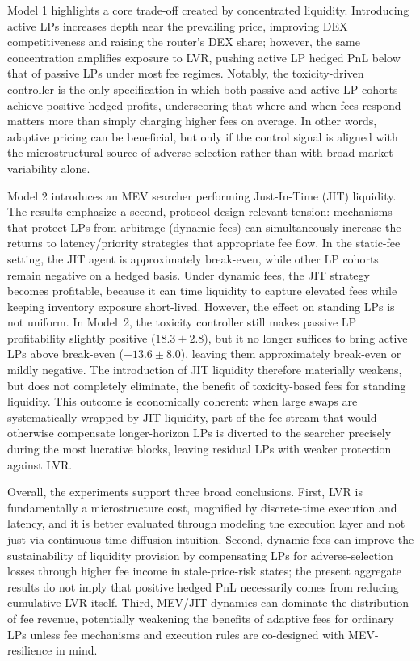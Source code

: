 \documentclass[11pt]{article}
\begin{document}
Model 1 highlights a core trade-off created by concentrated liquidity. Introducing active LPs increases depth near 
the prevailing price, improving DEX competitiveness and raising the router’s DEX share; however, the same concentration 
amplifies exposure to LVR, pushing active LP hedged PnL below that of passive LPs under most fee regimes. Notably, 
the toxicity-driven controller is the only specification in which both passive and active LP cohorts achieve positive 
hedged profits, underscoring that where and when fees respond matters more than simply charging higher fees on average. 
In other words, adaptive pricing can be beneficial, but only if the control signal is aligned with the microstructural 
source of adverse selection rather than with broad market variability alone.


Model 2 introduces an MEV searcher performing Just-In-Time (JIT) liquidity. The results emphasize a second,
protocol-design-relevant tension: mechanisms that protect LPs from arbitrage (dynamic fees) can simultaneously increase
the returns to latency/priority strategies that appropriate fee flow. In the static-fee setting, the JIT agent is
approximately break-even, while other LP cohorts remain negative on a hedged basis. Under dynamic fees, the JIT strategy
becomes profitable, because it can time liquidity to capture elevated fees while keeping inventory exposure short-lived.
However, the effect on standing LPs is not uniform. In Model~2, the toxicity controller still makes passive LP
profitability slightly positive (\(18.3\pm 2.8\)), but it no longer suffices to bring active LPs above break-even
(\(-13.6\pm 8.0\)), leaving them approximately break-even or mildly negative. The introduction of JIT liquidity therefore
materially weakens, but does not completely eliminate, the benefit of toxicity-based fees for standing liquidity. This
outcome is economically coherent: when large swaps are systematically wrapped by JIT liquidity, part of the fee stream
that would otherwise compensate longer-horizon LPs is diverted to the searcher precisely during the most lucrative blocks,
leaving residual LPs with weaker protection against LVR.



Overall, the experiments support three broad conclusions. First, LVR is fundamentally a microstructure cost, magnified
by discrete-time execution and latency, and it is better evaluated through modeling the execution layer and not just
via continuous-time diffusion intuition. Second, dynamic fees can improve the sustainability of liquidity provision by
compensating LPs for adverse-selection losses through higher fee income in stale-price-risk states; the present aggregate
results do not imply that positive hedged PnL necessarily comes from reducing cumulative LVR itself. Third, MEV/JIT
dynamics can dominate the distribution of fee revenue, potentially weakening the benefits of adaptive fees for ordinary
LPs unless fee mechanisms and execution rules are co-designed with MEV-resilience in mind.
\end{document}
